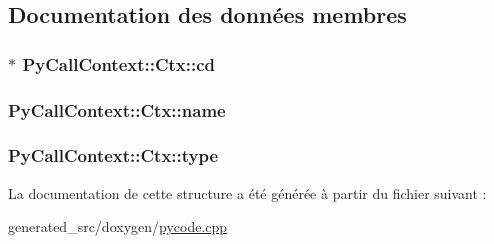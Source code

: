 \subsection{Documentation des données membres}
\hypertarget{struct_py_call_context_1_1_ctx_a58636a7a4ef3e0038834b1ee34a5d8f9}{}
\subsubsection[{cd}]{$\ast$ Py\+Call\+Context\+::\+Ctx\+::cd}\label{struct_py_call_context_1_1_ctx_a58636a7a4ef3e0038834b1ee34a5d8f9}
\hypertarget{struct_py_call_context_1_1_ctx_a71f14a5904a47903b8ea2804d7a49b70}{}
\subsubsection[{name}]{ Py\+Call\+Context\+::\+Ctx\+::name}\label{struct_py_call_context_1_1_ctx_a71f14a5904a47903b8ea2804d7a49b70}
\hypertarget{struct_py_call_context_1_1_ctx_a2fdc3acb8e79d8e4053f9aa4168b7465}{}
\subsubsection[{type}]{ Py\+Call\+Context\+::\+Ctx\+::type}\label{struct_py_call_context_1_1_ctx_a2fdc3acb8e79d8e4053f9aa4168b7465}


La documentation de cette structure a été générée à partir du fichier suivant \+:\begin{DoxyCompactItemize}
\item 
generated\+\_\+src/doxygen/\hyperlink{pycode_8cpp}{pycode.\+cpp}\end{DoxyCompactItemize}
